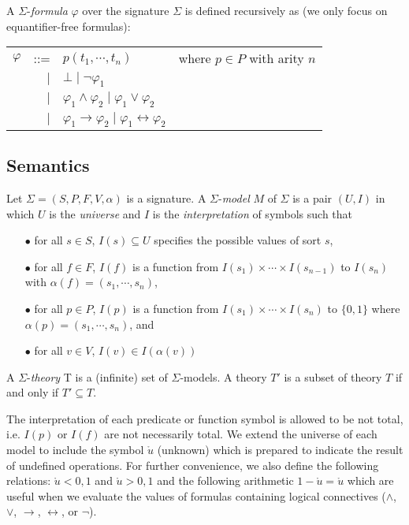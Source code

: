 A $\Sigma$-\emph{formula} $\varphi$ over the signature $\Sigma$ is defined recursively as (we only focus on equantifier-free formulas):

\begin{center}
\begin{tabular}{l r l l}
$\varphi$ &::=& $p(t_1, \cdots, t_n)$ &where $p \in P$ with arity $n$ \\ 
&$\mid$ & $\bot \mid \neg \varphi_1$ &\\
&$\mid$ & $\varphi_1 \wedge \varphi_2 \mid \varphi_1 \vee \varphi_2$ & \\
&$\mid$ & $\varphi_1 \rightarrow \varphi_2 \mid \varphi_1 \leftrightarrow \varphi_2$ & \\
\end{tabular}
\end{center}

\subsection{Semantics}

\begin{definition}
Let $\Sigma = (S, P, F, V, \alpha)$ is a signature. A $\Sigma$-\emph{model} $M$ of $\Sigma$ is a pair $(U, I)$ in which $U$ is the \emph{universe} and $I$ is the \emph{interpretation} of symbols such that
\begin{itemize}
\sloppy
\item[$\bullet$] for all $s \in S$, $I(s) \subseteq U$ specifies the possible values of sort $s$,
\item[$\bullet$] for all $f \in F$, $I(f)$ is a function from $I(s_1) \times \cdots \times I(s_{n-1})$ to $I(s_n)$ with ${\alpha(f) = (s_1,\cdots, s_n)}$,
\item[$\bullet$] for all $p \in P$, $I(p)$ is a function from $I(s_1) \times \cdots \times I(s_n)$ to $\{0, 1\}$ where ${\alpha(p) = (s_1,\cdots, s_n)}$, and
\item[$\bullet$] for all $v \in V$, $I(v) \in I(\alpha(v))$
\end{itemize}
A $\Sigma$-\emph{theory} T is a (infinite) set of $\Sigma$-models. A theory $T'$ is a subset of theory $T$ if and only if $T' \subseteq T$.
\end{definition}

The interpretation of each predicate or function symbol is allowed to be not total, i.e. $I(p)$ or $I(f)$ are not necessarily total. We extend the universe of each model to include the symbol $\mathring{u}$ (unknown) which is prepared to indicate the result of undefined operations. For further convenience, we also define the following relations: $\mathring{u} < 0, 1$ and $\mathring{u} > 0, 1$ and the following arithmetic $1 - \mathring{u} = \mathring{u}$ which are useful when we evaluate the values of formulas containing logical connectives ($\wedge$, $\vee$, $\rightarrow$, $\leftrightarrow$, or $\neg$). 

